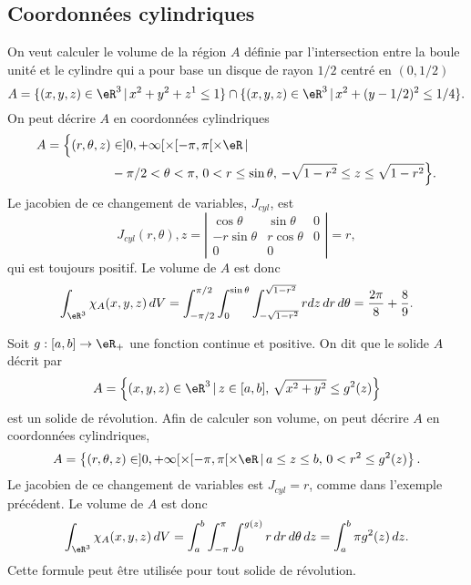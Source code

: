 \subsection{Coordonnées cylindriques}

\begin{example}
	On veut calculer le volume de la région $A$ définie par  l'intersection entre la boule unité et le cylindre qui a pour base un disque de rayon $1/2$ centré en $(0, 1/2)$
	\[
		A=\{(x,y,z) \in\eR^3 \,\vert\, x^2+y^2+z^1\leq 1\}\cap\{(x,y,z) \in \eR^3\,\vert\, x^2+(y-1/2)^2\leq 1/4\}.
	\]
	On peut décrire $A$ en coordonnées cylindriques
	\begin{equation}
		\begin{aligned}
			A=\Big\{(r,\theta,z) & \in ]0, +\infty[\times [-\pi,\pi[\times \eR\,\vert\,                                     \\
			                     & -\pi/2<\theta<\pi, \, 0<r\leq \sin\theta, \, -\sqrt{1-r^2}\leq z\leq\sqrt{1-r^2} \Big\}.
		\end{aligned}
	\end{equation}
	Le jacobien de ce changement de variables,  $J_{cyl}$, est
	\begin{equation}
		J_{cyl}(r, \theta), z= \left\vert\begin{array}{ccc}
			\cos \theta   & \sin \theta  & 0 \\
			-r\sin \theta & r\cos \theta & 0 \\
			0             & 0            &
		\end{array}\right\vert= r,
	\end{equation}
	qui est toujours positif. Le volume de $A$ est donc
	\[
		\int_{\eR^3}\chi_{A}(x,y,z)\, dV=\int_{-\pi/2}^{\pi/2}\int_0^{\sin\theta}\int_{-\sqrt{1-r^2}}^{\sqrt{1-r^2}} r dz\,dr\,d\theta=\frac{2\pi}{8}+\frac{8}{9}.
	\]
\end{example}

\begin{example}
	Soit $g:[a,b]\to\eR_+$ une fonction continue et positive. On dit que le solide $A$ décrit par
	\[
		A=\left\{(x,y,z)\in\eR^3\, \vert \, z\in[a,b], \,\sqrt{x^2+y^2}\leq g^2(z) \right\}
	\]
	est un solide de révolution. Afin de calculer son volume, on peut décrire $A$ en coordonnées cylindriques,
	\[
		A=\left\{(r,\theta,z) \in ]0, +\infty[\times [-\pi,\pi[\times \eR\,\vert\, a\leq z\leq b, \, 0<r^2\leq g^2(z) \right\}.
	\]
	Le jacobien de ce changement de variables est  $J_{cyl}=r$, comme dans l'exemple précédent. Le volume de $A$ est donc
	\[
		\int_{\eR^3}\chi_{A}(x,y,z)\, dV=\int_a^{b}\int_{-\pi}^{\pi}\int_{0}^{g(z)} r  \,dr\,d\theta\, dz=\int_a^{b} \pi g^2(z) \, dz.
	\]
	Cette formule peut être utilisée pour tout solide de révolution.
\end{example}

